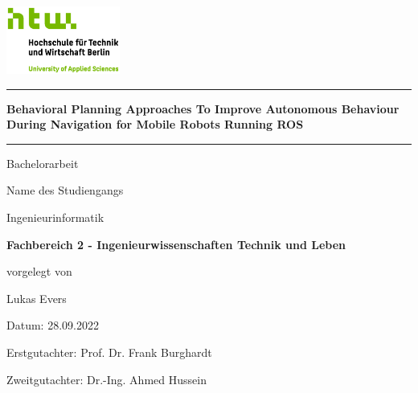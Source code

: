 \begin{titlepage}

\begin{center}
\includegraphics[width=0.28\textwidth,keepaspectratio]{images/HTW_Logo_rgb.jpg}
\end{center}

\bigskip
\bigskip 
\bigskip 
\bigskip 

\par\noindent\rule{\textwidth}{0.4pt}

\bigskip 
\bigskip 
\bigskip 
 
\begin{center}
	\begin{Large}
		\color{htwgreen}
		\textbf{Behavioral Planning Approaches To Improve Autonomous Behaviour During
Navigation for Mobile Robots Running ROS}
	\end{Large}
	
	\bigskip 
	\bigskip 
	\par\noindent\rule{\textwidth}{0.4pt}
	
	\medskip 
	Bachelorarbeit
	\bigskip 
	\bigskip
	\bigskip 
	\bigskip 
	\bigskip
	\bigskip 
	\bigskip 

	\bigskip
	Name des Studiengangs\\
	
	\medskip
	\begin{Large}
		Ingenieurinformatik
	\end{Large}
	
	\bigskip 
	\begin{Large}
		\color{htwgreen}
		\textbf{Fachbereich 2 - Ingenieurwissenschaften Technik und Leben}
	\end{Large}

	\bigskip 
	vorgelegt von \\
		
	\begin{Large}
		Lukas Evers\\
		
	\end{Large}
	
	\bigskip 
	\bigskip 
	\bigskip 
	\bigskip 
	\bigskip 
	\bigskip 
	\bigskip 
	\bigskip 	
	\bigskip 	
	\bigskip 
	\bigskip
	Datum:
	28.09.2022\\
	\bigskip
	
	\begin{Large}
		Erstgutachter: Prof. Dr. Frank Burghardt \\
		
	\end{Large}
	
	\begin{Large}
		Zweitgutachter: Dr.-Ing. Ahmed Hussein \\
		
	\end{Large}


\end{center}

\end{titlepage}